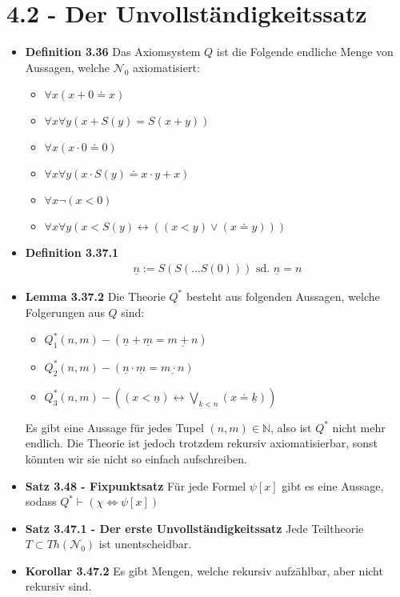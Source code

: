 \documentclass{scrartcl}
\newcommand{\proves}[0]{\vdash}
\begin{document}
\section*{4.2 - Der Unvollständigkeitssatz}
\begin{itemize}
    \item{\textbf{Definition 3.36}} Das Axiomsystem $Q$ ist die Folgende endliche Menge von Aussagen, welche $\mathcal{N}_0$ axiomatisiert:
    \begin{itemize}
        \item $\forall x(x + 0 \doteq x)$
        \item $\forall x \forall y (x + S(y) = S(x+y))$
        \item $\forall x (x \cdot 0 \doteq 0)$
        \item $\forall x \forall y(x \cdot S(y) \doteq x \cdot y + x)$
        \item $\forall x \neg (x < 0)$
        \item $\forall x \forall y(x < S(y) \leftrightarrow ((x < y) \vee (x \doteq y)))$
    \end{itemize}
    \item{\textbf{Definition 3.37.1}}
    \begin{align*}
        \underline{n} := S(S(\hdots S(0))) \text{ sd. } \underline{n} = n
    \end{align*}
    \item{\textbf{Lemma 3.37.2}}
    Die Theorie $Q^{*}$ besteht aus folgenden Aussagen, welche Folgerungen aus $Q$ sind:
    \begin{itemize}
        \item $Q^{*}_{1}(n,m) - (\underline{n} + \underline{m} = \underline{m+n})$
        \item $Q^{*}_{2}(n,m) - (\underline{n} \cdot \underline{m} = \underline{m \cdot n})$
        \item $Q^{*}_{3}(n,m) - ((x < \underline{n}) \leftrightarrow \bigvee_{k < n} (x \doteq \underline{k}))$ 
    \end{itemize}
    Es gibt eine Aussage für jedes Tupel $(n,m) \in \mathbb{N}$, also ist $Q^{*}$ nicht mehr endlich. Die Theorie ist jedoch trotzdem rekursiv axiomatisierbar, sonst könnten wir sie nicht so einfach aufschreiben.
     \item\textbf{Satz 3.48 - Fixpunktsatz} Für jede Formel $\psi[x]$ gibt es eine Aussage, sodass $Q^* \proves (\chi \Leftrightarrow \psi[x])$
    \item\textbf{Satz 3.47.1 - Der erste Unvollständigkeitssatz} Jede Teiltheorie $T \subset Th(\mathcal{N}_0)$ ist unentscheidbar.
    \item\textbf{Korollar 3.47.2} Es gibt Mengen, welche rekursiv aufzählbar, aber nicht rekursiv sind. 
\end{itemize}
\pagebreak
\end{document}
